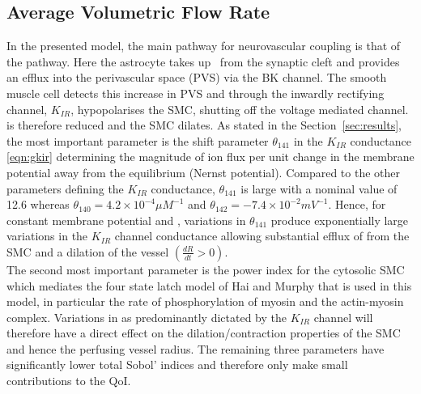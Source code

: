 \subsection{Average Volumetric Flow Rate}
In the presented model, the main pathway for neurovascular coupling is that of the \pot pathway. Here the astrocyte takes up \pot ~from the synaptic cleft and provides an efflux into the perivascular space (PVS) via the BK channel. The smooth muscle cell detects this increase in PVS \pot and through the inwardly rectifying channel, $K_{IR}$, hypopolarises the SMC, shutting off the voltage mediated \ca channel.  \ca is therefore reduced and the SMC dilates. As stated in the Section~\ref{sec:results}, the most important parameter is the shift parameter $\theta_{141}$ in the $K_{IR}$ conductance \eqref{eqn:gkir} determining the magnitude of ion flux per unit change in the membrane potential away from the equilibrium (Nernst potential).  Compared to the other parameters defining the $K_{IR}$ conductance, $\theta_{141}$ is large with a nominal value of 12.6 whereas $\theta_{140}=4.2 \times 10^{-4} \mu M^{-1}$ and $\theta_{142} = -7.4 \times10^{-2} mV^{-1}$. Hence, for constant membrane potential and \pot,   variations in $\theta_{141}$ produce exponentially large variations in the $K_{IR}$ channel conductance allowing substantial efflux of \ca from the SMC and a dilation of the vessel $\left(\frac{dR}{dt}> 0\right)$. \\

The second most important parameter is the power index for the cytosolic SMC \ca which mediates the four state latch model of Hai and Murphy \cite{Hai1988} that is used in this model, in particular the rate of phosphorylation of  myosin and the actin-myosin complex.  Variations in \ca as predominantly dictated by the $K_{IR}$ channel will therefore have a direct effect on the dilation/contraction properties of the SMC and hence the perfusing vessel radius.  
The remaining three parameters have significantly lower total Sobol' indices and therefore only make small contributions to the QoI.
 
